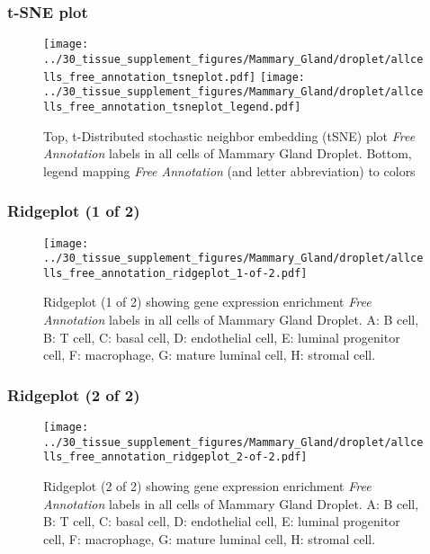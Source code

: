 \clearpage
\subsubsection{t-SNE plot}
\begin{figure}[h]
\centering
\texttt{[image: ../30\_tissue\_supplement\_figures/Mammary\_Gland/droplet/allcells\_free\_annotation\_tsneplot.pdf]}
\texttt{[image: ../30\_tissue\_supplement\_figures/Mammary\_Gland/droplet/allcells\_free\_annotation\_tsneplot\_legend.pdf]}
\caption{Top, t-Distributed stochastic neighbor embedding (tSNE) plot  \emph{Free Annotation} labels in all cells of Mammary Gland Droplet. Bottom, legend mapping \emph{Free Annotation} (and letter abbreviation) to colors}
\end{figure}


\clearpage

\subsubsection{Ridgeplot (1 of 2)}
\begin{figure}[h]
\centering
\texttt{[image: ../30\_tissue\_supplement\_figures/Mammary\_Gland/droplet/allcells\_free\_annotation\_ridgeplot\_1-of-2.pdf]}

\caption{ Ridgeplot (1 of 2)  showing gene expression enrichment \emph{Free Annotation} labels in all cells of Mammary Gland Droplet. A: B cell, B: T cell, C: basal cell, D: endothelial cell, E: luminal progenitor cell, F: macrophage, G: mature luminal cell, H: stromal cell.}
\end{figure}


\clearpage

\subsubsection{Ridgeplot (2 of 2)}
\begin{figure}[h]
\centering
\texttt{[image: ../30\_tissue\_supplement\_figures/Mammary\_Gland/droplet/allcells\_free\_annotation\_ridgeplot\_2-of-2.pdf]}

\caption{ Ridgeplot (2 of 2)  showing gene expression enrichment \emph{Free Annotation} labels in all cells of Mammary Gland Droplet. A: B cell, B: T cell, C: basal cell, D: endothelial cell, E: luminal progenitor cell, F: macrophage, G: mature luminal cell, H: stromal cell.}
\end{figure}


\clearpage

